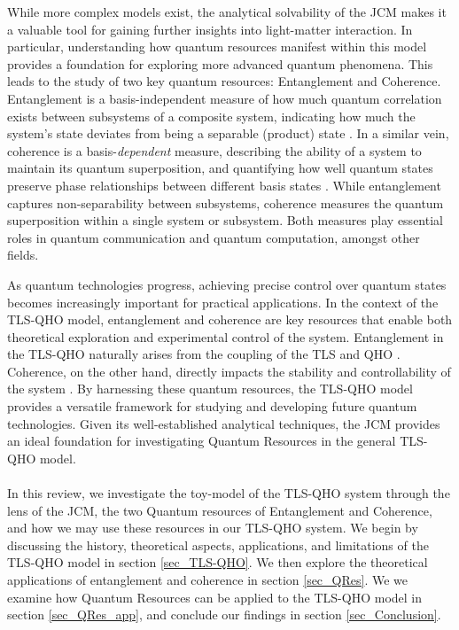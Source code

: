 \documentclass[12pt,a4paper]{article}
\begin{document}
While more complex models exist, the analytical solvability of the JCM makes it a valuable tool for gaining further insights into light-matter interaction. In particular, understanding how quantum resources manifest within this model provides a foundation for exploring more advanced quantum phenomena. This leads to the study of two key quantum resources: Entanglement and Coherence. Entanglement is a basis-independent measure of how much quantum correlation exists between subsystems of a composite system, indicating how much the system's state deviates from being a separable (product) state \cite{Entanglement2009-Definition}. In a similar vein, coherence is a basis-\textit{dependent} measure, describing the ability of a system to maintain its quantum superposition, and quantifying how well quantum states preserve phase relationships between different basis states \cite{Coherence2017-Colloquium}. While entanglement captures non-separability between subsystems, coherence measures the quantum superposition within a single system or subsystem. Both measures play essential roles in quantum communication and quantum computation, amongst other fields.

As quantum technologies progress, achieving precise control over quantum states becomes increasingly important for practical applications. In the context of the TLS-QHO model, entanglement and coherence are key resources that enable both theoretical exploration and experimental control of the system. Entanglement in the TLS-QHO naturally arises from the coupling of the TLS and QHO \cite{Entanglement2009-REE_VNapplied}. Coherence, on the other hand, directly impacts the stability and controllability of the system \cite{Coherence2020-JCMapplied}.  By harnessing these quantum resources, the TLS-QHO model provides a versatile framework for studying and developing future quantum technologies. Given its well-established analytical techniques, the JCM provides an ideal foundation for investigating Quantum Resources in the general TLS-QHO model.  \\
\\
In this review, we investigate the toy-model of the TLS-QHO system through the lens of the JCM, the two Quantum resources of Entanglement and Coherence, and how we may use these resources in our TLS-QHO system. We begin by discussing the history, theoretical aspects, applications, and limitations of the TLS-QHO model in section \ref{sec_TLS-QHO}. We then explore the theoretical applications of entanglement and coherence in section \ref{sec_QRes}. We we examine how Quantum Resources can be applied to the TLS-QHO model in section \ref{sec_QRes_app}, and conclude our findings in section \ref{sec_Conclusion}.
\end{document}
